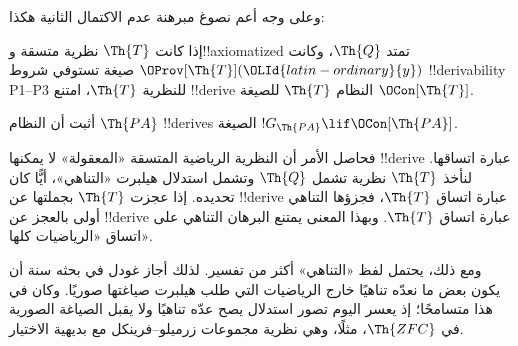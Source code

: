 \documentclass[../../../include/open-logic-section]{subfiles}
\begin{document}
وعلى وجه أعم نصوغ مبرهنة عدم الاكتمال الثانية هكذا:

\begin{thm}
 إذا كانت $\Th{T}$
نظرية متسقة و!!{axiomatized} تمتد $\Th{Q}$، وكانت
$\OProv[\Th{T}](\OLId{latin-ordinary}{y})$ صيغة تستوفي شروط !!{derivability}
P1--P3 للنظرية $\Th{T}$، امتنع !!{derive} النظام
$\Th{T}$ للصيغة $\OCon[\Th{T}]$.
\end{thm}

\begin{prob}
أثبت أن النظام $\Th{PA}$ !!{derive}s الصيغة
$!G_{\Th{PA}} \lif \OCon[\Th{PA}]$.
\end{prob}

\begin{digress}
فحاصل الأمر أن النظرية الرياضية المتسقة «المعقولة» لا يمكنها
!!{derive} عبارة اتساقها. لنأخذ $\Th{T}$ نظرية تشمل
$\Th{Q}$ وتشمل استدلال هيلبرت «التناهي»، أيًّا كان تحديده.
إذا عجزت $\Th{T}$ بجملتها عن !!{derive} عبارة اتساق $\Th{T}$،
فجزؤها التناهي أولى بالعجز عن !!{derive} عبارة اتساق $\Th{T}$.
وبهذا المعنى يمتنع البرهان التناهي على اتساق «الرياضيات كلها».

ومع ذلك، يحتمل لفظ «التناهي» أكثر من تفسير. لذلك أجاز غودل
في بحثه سنة  أن يكون بعض ما نعدّه تناهيًا خارج الرياضيات التي
طلب هيلبرت صياغتها صوريًا. وكان في هذا متسامحًا؛ إذ يعسر اليوم
تصور استدلال يصح عدّه تناهيًا ولا يقبل الصياغة الصورية في
$\Th{ZFC}$، مثلًا، وهي نظرية مجموعات زرميلو--فرينكل مع بديهية
الاختيار.
\end{digress}
\end{document}

